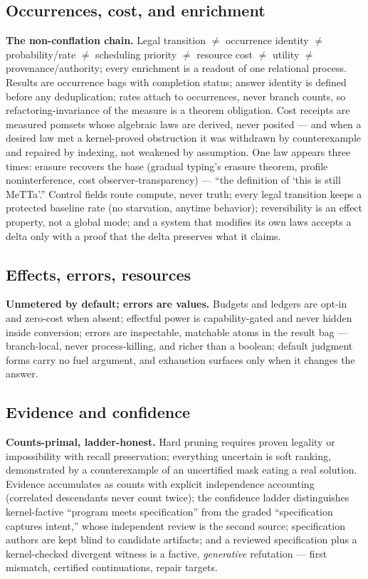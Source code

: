 \documentclass[11pt]{article}
\begin{document}
\subsection{Occurrences, cost, and enrichment}
\textbf{The non-conflation chain.}  Legal transition $\neq$ occurrence
identity $\neq$ probability/rate $\neq$ scheduling priority $\neq$
resource cost $\neq$ utility $\neq$ provenance/authority; every
enrichment is a readout of one relational process.  Results are
occurrence bags with completion status; answer identity is defined before
any deduplication; rates attach to occurrences, never branch counts, so
refactoring-invariance of the measure is a theorem obligation.  Cost
receipts are measured pomsets whose algebraic laws are derived, never
posited --- and when a desired law met a kernel-proved obstruction it was
withdrawn by counterexample and repaired by indexing, not weakened by
assumption.  One law appears three times: erasure recovers the base
(gradual typing's erasure theorem, profile noninterference, cost
observer-transparency) --- ``the definition of `this is still MeTTa'.''
Control fields route compute, never truth; every legal transition keeps a
protected baseline rate (no starvation, anytime behavior); reversibility
is an effect property, not a global mode; and a system that modifies its
own laws accepts a delta only with a proof that the delta preserves what
it claims.

\subsection{Effects, errors, resources}
\textbf{Unmetered by default; errors are values.}  Budgets and ledgers
are opt-in and zero-cost when absent; effectful power is capability-gated
and never hidden inside conversion; errors are inspectable, matchable
atoms in the result bag --- branch-local, never process-killing, and
richer than a boolean; default judgment forms carry no fuel argument, and
exhaustion surfaces only when it changes the answer.

\subsection{Evidence and confidence}
\textbf{Counts-primal, ladder-honest.}  Hard pruning requires proven
legality or impossibility with recall preservation; everything uncertain
is soft ranking, demonstrated by a counterexample of an uncertified mask
eating a real solution.  Evidence accumulates as counts with explicit
independence accounting (correlated descendants never count twice); the
confidence ladder distinguishes kernel-factive ``program meets
specification'' from the graded ``specification captures intent,'' whose
independent review is the second source; specification authors are kept
blind to candidate artifacts; and a reviewed specification plus a
kernel-checked divergent witness is a factive, \emph{generative}
refutation --- first mismatch, certified continuations, repair targets.
\end{document}
